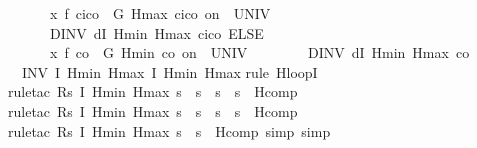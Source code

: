 \documentclass[envcountsame]{llncs}
\begin{document}
\begin{example}
\begin{isabellebody}
\ \ \ \ \ \ {\isacharparenleft}x{\isasymacute}{\isacharequal}\ f\ {\isacharparenleft}c\isactrlsub i{\isacharminus}c\isactrlsub o{\isacharparenright}\ {\isacharampersand}\ G\ Hmax\ {\isacharparenleft}c\isactrlsub i{\isacharminus}c\isactrlsub o{\isacharparenright}\ on\ {\isacharbraceleft}{}{\isachardot}{\isachardot}{\isasymtau}{\isacharbraceright}\ UNIV\ {\isacharat}\ {}\isanewline 
\ \ \ \ \ \ DINV\ {\isacharparenleft}dI\ Hmin\ Hmax\ {\isacharparenleft}c\isactrlsub i{\isacharminus}c\isactrlsub o{\isacharparenright}{\isacharparenright}{\isacharparenright}\ ELSE\ \isanewline
\ \ \ \ \ \ {\isacharparenleft}x{\isasymacute}{\isacharequal}\ f\ {\isacharparenleft}{\isacharminus}c\isactrlsub o{\isacharparenright}\ {\isacharampersand}\ G\ Hmin\ {\isacharparenleft}{\isacharminus}c\isactrlsub o{\isacharparenright}\ on\ {\isacharbraceleft}{}{\isachardot}{\isachardot}{\isasymtau}{\isacharbraceright}\ UNIV\ {\isacharat}\ {}\isanewline 
\ \ \ \ \ \ DINV\ {\isacharparenleft}dI\ Hmin\ Hmax\ {\isacharparenleft}{\isacharminus}c\isactrlsub o{\isacharparenright}{\isacharparenright}{\isacharparenright}{\isacharparenright}\ {\isacharparenright}\isanewline
\ \ INV\ I\ Hmin\ Hmax{\isacharparenright}\ {\isasymlceil}I\ Hmin\ Hmax{\isasymrceil}{\isachardoublequoteclose}\isanewline
{}\isamarkupfalse%
{\isacharparenleft}rule\ H{\isacharunderscore}loopI{\isacharparenright}\isanewline
\ \ \ \ \isamarkupfalse%
{\isacharparenleft}rule{\isacharunderscore}tac\ R{\isacharequal}{\isachardoublequoteopen}{\isasymlambda}s{\isachardot}\ I\ Hmin\ Hmax\ s\ {\isasymand}\ s{\isachardollar}{}{\isacharequal}{}\ {\isasymand}\ s{\isachardollar}{}\ {\isacharequal}\ s{\isachardollar}{}{\isachardoublequoteclose}\ \ H{\isacharunderscore}comp{\isacharparenright}\isanewline
\ \ \ \ \ \isamarkupfalse%
{\isacharparenleft}rule{\isacharunderscore}tac\ R{\isacharequal}{\isachardoublequoteopen}{\isasymlambda}s{\isachardot}\ I\ Hmin\ Hmax\ s\ {\isasymand}\ s{\isachardollar}{}{\isacharequal}{}\ {\isasymand}\ s{\isachardollar}{}\ {\isacharequal}\ s{\isachardollar}{}{\isachardoublequoteclose}\ \ H{\isacharunderscore}comp{\isacharparenright}\isanewline
\ \ \ \ \ \ \isamarkupfalse%
{\isacharparenleft}rule{\isacharunderscore}tac\ R{\isacharequal}{\isachardoublequoteopen}{\isasymlambda}s{\isachardot}\ I\ Hmin\ Hmax\ s\ {\isasymand}\ s{\isachardollar}{}{\isacharequal}{}{\isachardoublequoteclose}\ \ H{\isacharunderscore}comp{\isacharcomma}\ simp{\isacharcomma}\ simp{\isacharparenright}\isanewline

\end{isabellebody}
\end{example}
\end{document}
